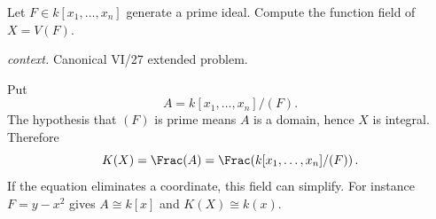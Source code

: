 \begin{problem}\label{prob:vi27-p15}
Let \(F\in k[x_1,\dots,x_n]\) generate a prime ideal. Compute the function field of \(X=V(F)\).
\par\smallskip\noindent\textit{context.} Canonical VI/27 extended problem.
\end{problem}

\ifdefined\FullProblemDossiers
\begin{solution}
Put
\[
A=k[x_1,\ldots,x_n]/(F).
\]
The hypothesis that \((F)\) is prime means \(A\) is a domain, hence \(X\) is integral. Therefore
\[
K(X)=\Frac(A)
=
\Frac\!\left(k[x_1,\ldots,x_n]/(F)\right).
\]
If the equation eliminates a coordinate, this field can simplify. For instance \(F=y-x^2\) gives \(A\cong k[x]\)
and \(K(X)\cong k(x)\).
\end{solution}
\fi
